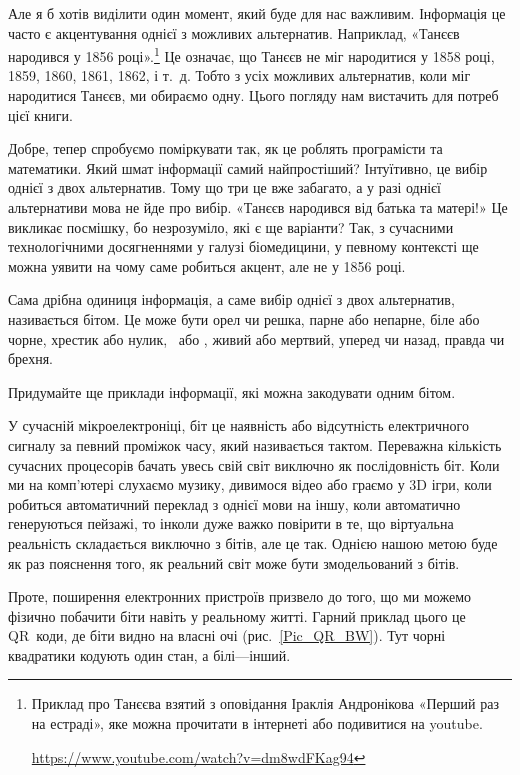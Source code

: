 \documentclass{book}
\begin{document}
Але я б хотів виділити один момент, який буде для нас важливим.
Інформація це часто є акцентування однієї з можливих альтернатив.
Наприклад, «Танєєв народився у 1856 році».\footnote{
  Приклад про Танєєва взятий з оповідання Іраклія Андронікова «Перший раз на естраді», яке можна прочитати в інтернеті або подивитися на youtube.
  \par\url{https://www.youtube.com/watch?v=dm8wdFKag94}}
Це означає, що Танєєв не міг народитися у 1858 році, 1859, 1860, 1861, 1862, і т.~д.
Тобто з усіх можливих альтернатив, коли міг народитися Танєєв, ми обираємо одну.
Цього погляду нам вистачить для потреб цієї книги.

Добре, тепер спробуємо поміркувати так, як це роблять програмісти та математики.
Який шмат інформації самий найпростіший?
Інтуїтивно, це вибір однієї з двох альтернатив.
Тому що три це вже забагато, а у разі однієї альтернативи мова не йде про вибір.
«Танєєв народився від батька та матері!»
Це викликає посмішку, бо незрозуміло, які є ще варіанти?
Так, з сучасними технологічними досягненнями у галузі біомедицини, у певному контексті ще можна уявити на чому саме робиться акцент, але не у 1856 році.

Сама дрібна одиниця інформація, а саме вибір однієї з двох альтернатив, називається бітом. 
Це може бути орел чи решка, парне або непарне, біле або чорне, хрестик або нулик, \Male\ або \Female, живий або мертвий, уперед чи назад, правда чи брехня.

\begin{exercise}
Придумайте ще приклади інформації, які можна закодувати одним бітом.
\end{exercise}

У сучасній мікроелектроніці, біт це наявність або відсутність електричного сигналу за певний проміжок часу, який називається тактом. 
Переважна кількість сучасних процесорів бачать увесь свій світ виключно як послідовність біт.
Коли ми на комп'ютері слухаємо музику, дивимося відео або граємо у 3D ігри, коли робиться автоматичний переклад з однієї мови на іншу, коли автоматично генеруються пейзажі, то інколи дуже важко повірити в те, що віртуальна реальність складається виключно з бітів, але це так.
Однією нашою метою буде як раз пояснення того, як реальний світ може бути змодельований з бітів.

Проте, поширення електронних пристроїв призвело до того, що ми можемо фізично побачити біти навіть у реальному житті.
Гарний приклад цього це QR~коди, де біти видно на власні очі (рис.~\ref{Pic_QR_BW}).
Тут чорні квадратики кодують один стан, а білі---інший.
\end{document}
